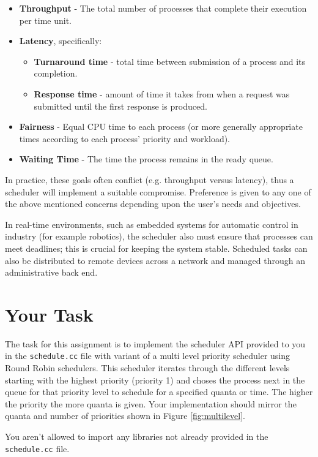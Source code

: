 \documentclass[11pt]{article}
\begin{document}
\begin{itemize}
\item \textbf{Throughput} - The total number of processes that complete their execution per time unit.
\item \textbf{Latency}, specifically:
\begin{itemize}
        \item \textbf{Turnaround time} - total time between submission of a process and its completion.
        \item \textbf{Response time} - amount of time it takes from when a request was submitted until the first response is produced.
\end{itemize}
\item \textbf{Fairness} - Equal CPU time to each process (or more generally appropriate times according to each process' priority and workload).
\item \textbf{Waiting Time} - The time the process remains in the ready queue.
\end{itemize}

In practice, these goals often conflict (e.g. throughput versus latency), thus a scheduler will implement a suitable compromise. Preference is given to any one of the above mentioned concerns depending upon the user's needs and objectives.

In real-time environments, such as embedded systems for automatic control in industry (for example robotics), the scheduler also must ensure that processes can meet deadlines; this is crucial for keeping the system stable. Scheduled tasks can also be distributed to remote devices across a network and managed through an administrative back end.

\section*{Your Task}

The task for this assignment is to implement the scheduler API provided to you in the {\tt schedule.cc} file with variant of a multi level priority scheduler using Round Robin schedulers. This scheduler iterates through the different levels starting with the highest priority (priority 1) and choses the process next in the queue for that priority level to schedule for a specified quanta or time. The higher the priority the more quanta is given. Your implementation should mirror the quanta and number of priorities shown in Figure \ref{fig:multilevel}. 

You aren't allowed to import any libraries not already provided in the {\tt schedule.cc} file.
\end{document}
